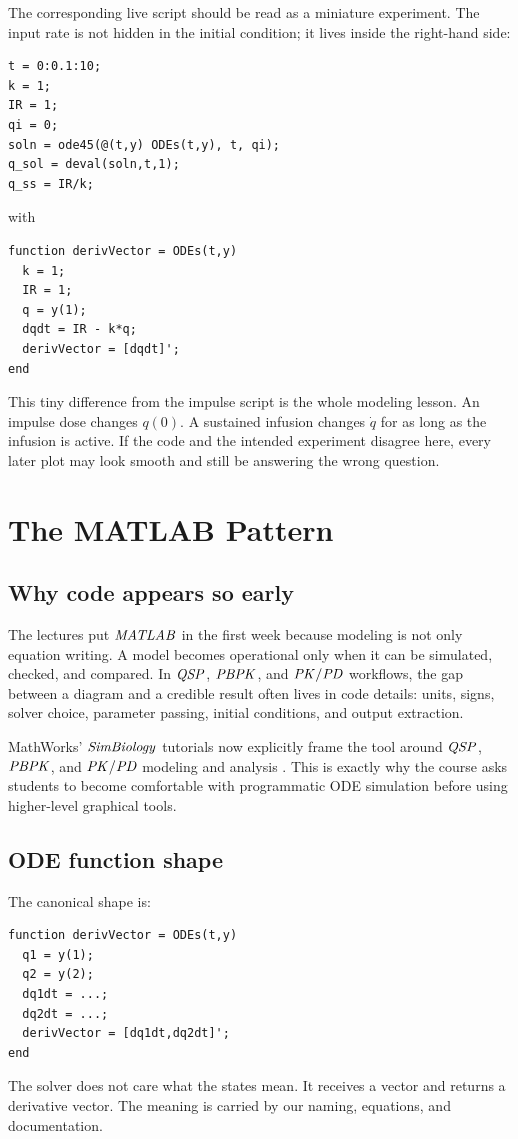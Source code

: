 \documentclass[a4paper]{article}
\newcommand{\PKPD}{\ensuremath{\pksym{PK}/\pksym{PD}}}
\newcommand{\QSP}{\ensuremath{\pksym{QSP}}}
\newcommand{\PBPK}{\ensuremath{\pksym{PBPK}}}
\newcommand{\MATLAB}{\ensuremath{\pksym{MATLAB}}}
\newcommand{\SimBio}{\ensuremath{\pksym{SimBiology}}}
\begin{document}
The corresponding live script should be read as a miniature experiment. The input rate is not hidden in the initial condition; it lives inside the right-hand side:
\begin{verbatim}
t = 0:0.1:10;
k = 1;
IR = 1;
qi = 0;
soln = ode45(@(t,y) ODEs(t,y), t, qi);
q_sol = deval(soln,t,1);
q_ss = IR/k;
\end{verbatim}
with
\begin{verbatim}
function derivVector = ODEs(t,y)
  k = 1;
  IR = 1;
  q = y(1);
  dqdt = IR - k*q;
  derivVector = [dqdt]';
end
\end{verbatim}
This tiny difference from the impulse script is the whole modeling lesson. An impulse dose changes \(q(0)\). A sustained infusion changes \(\dot q\) for as long as the infusion is active. If the code and the intended experiment disagree here, every later plot may look smooth and still be answering the wrong question.

\section{The MATLAB Pattern}

\subsection{Why code appears so early}

The lectures put \MATLAB{} in the first week because modeling is not only equation writing. A model becomes operational only when it can be simulated, checked, and compared. In \QSP{}, \PBPK{}, and \PKPD{} workflows, the gap between a diagram and a credible result often lives in code details: units, signs, solver choice, parameter passing, initial conditions, and output extraction.

MathWorks' \SimBio{} tutorials now explicitly frame the tool around \QSP{}, \PBPK{}, and \PKPD{} modeling and analysis \cite{mathworksSimBiologyTutorials2026}. This is exactly why the course asks students to become comfortable with programmatic ODE simulation before using higher-level graphical tools.

\subsection{ODE function shape}

The canonical shape is:
\begin{verbatim}
function derivVector = ODEs(t,y)
  q1 = y(1);
  q2 = y(2);
  dq1dt = ...;
  dq2dt = ...;
  derivVector = [dq1dt,dq2dt]';
end
\end{verbatim}
The solver does not care what the states mean. It receives a vector and returns a derivative vector. The meaning is carried by our naming, equations, and documentation.
\end{document}
